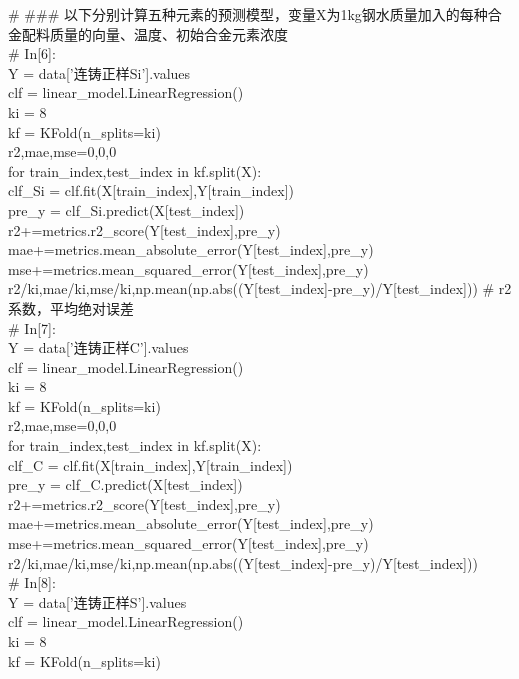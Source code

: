 \documentclass{xcumcmart}
\begin{document}
\# \#\#\# 以下分别计算五种元素的预测模型，变量X为1kg钢水质量加入的每种合金配料质量的向量、温度、初始合金元素浓度 \\
\# In[6]: \\
Y = data['连铸正样Si'].values \\
clf = linear\_model.LinearRegression() \\
ki = 8 \\
kf = KFold(n\_splits=ki) \\
r2,mae,mse=0,0,0 \\
for train\_index,test\_index in kf.split(X): \\
clf\_Si = clf.fit(X[train\_index],Y[train\_index]) \\
pre\_y = clf\_Si.predict(X[test\_index]) \\
r2+=metrics.r2\_score(Y[test\_index],pre\_y) \\
mae+=metrics.mean\_absolute\_error(Y[test\_index],pre\_y) \\
mse+=metrics.mean\_squared\_error(Y[test\_index],pre\_y) \\
r2/ki,mae/ki,mse/ki,np.mean(np.abs((Y[test\_index]-pre\_y)/Y[test\_index])) \# r2系数，平均绝对误差 \\
\# In[7]: \\
Y = data['连铸正样C'].values \\
clf = linear\_model.LinearRegression() \\
ki = 8 \\
kf = KFold(n\_splits=ki) \\
r2,mae,mse=0,0,0 \\
for train\_index,test\_index in kf.split(X): \\
clf\_C = clf.fit(X[train\_index],Y[train\_index]) \\
pre\_y = clf\_C.predict(X[test\_index]) \\
r2+=metrics.r2\_score(Y[test\_index],pre\_y) \\
mae+=metrics.mean\_absolute\_error(Y[test\_index],pre\_y) \\
mse+=metrics.mean\_squared\_error(Y[test\_index],pre\_y) \\
r2/ki,mae/ki,mse/ki,np.mean(np.abs((Y[test\_index]-pre\_y)/Y[test\_index])) \\
\# In[8]: \\
Y = data['连铸正样S'].values \\
clf = linear\_model.LinearRegression() \\
ki = 8 \\
kf = KFold(n\_splits=ki) \\
\end{document}
